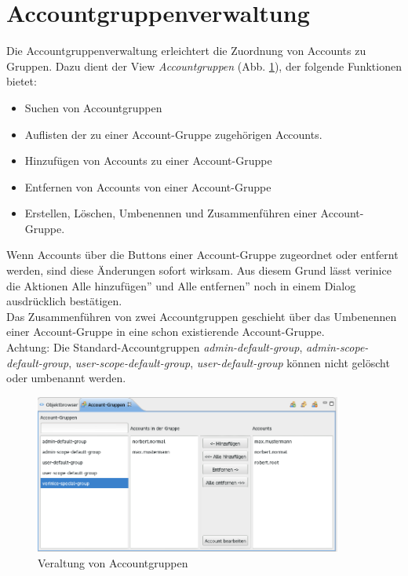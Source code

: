 \documentclass[a4paper,10pt]{book}
\begin{document}
\section{Accountgruppenverwaltung}
\label{Accountgruppenverwaltung}

Die Accountgruppenverwaltung erleichtert die Zuordnung von Accounts
zu Gruppen. Dazu dient der View \textit{Accountgruppen}
(Abb. \ref{fig:account-groups-managment}), der folgende Funktionen
bietet:

\begin{itemize}
\item Suchen von Accountgruppen
\item Auflisten der zu einer Account-Gruppe zugehörigen Accounts.
\item Hinzufügen von Accounts zu einer Account-Gruppe
\item Entfernen von Accounts von einer Account-Gruppe
\item Erstellen, Löschen, Umbenennen und Zusammenführen einer
  Account-Gruppe.
\end{itemize}

Wenn Accounts über die Buttons einer Account-Gruppe zugeordnet oder
entfernt werden, sind diese Änderungen sofort wirksam. Aus diesem
Grund lässt verinice die Aktionen \glqq Alle hinzufügen'' und \glqq
Alle entfernen'' noch in einem Dialog ausdrücklich bestätigen.\\

Das Zusammenführen von zwei Accountgruppen geschieht über das
Umbenennen einer Account-Gruppe in eine schon existierende
Account-Gruppe.\\

Achtung: Die Standard-Accountgruppen \textit{admin-default-group},
\textit{admin-scope-default-group}, \textit{user-scope-default-group},
\textit{user-default-group} können nicht gelöscht oder umbenannt
werden.

\begin{figure}
  \centering
  \includegraphics[width=0.9\textwidth]{Screenshot/account-groups.png}
  \caption{Veraltung von Accountgruppen}
\label{fig:account-groups-managment}
\end{figure}
\end{document}
